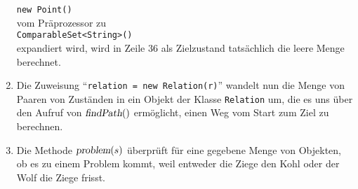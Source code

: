\begin{enumerate}
      \hspace*{1.3cm}
      \texttt{new Point()}
      \\[0.2cm]
      vom Pr\"aprozessor zu
      \\[0.2cm]
      \hspace*{1.3cm}
      \texttt{ComparableSet<String>()}
      \\[0.2cm]
      expandiert wird, wird in Zeile 36 als Zielzustand tats\"achlich die leere Menge
      berechnet.
\item Die Zuweisung ``\texttt{relation = new Relation(r)}'' wandelt nun die Menge von
      Paaren von Zust\"anden in ein Objekt der Klasse \texttt{Relation} um, die es uns
      \"uber den Aufruf von $\textsl{findPath}()$ erm\"oglicht, einen Weg vom Start
      zum Ziel zu berechnen.  
\item Die Methode $\textsl{problem}(s)$ \"uberpr\"uft f\"ur eine gegebene Menge von Objekten,
      ob es zu einem Problem kommt, weil entweder die Ziege den Kohl oder der Wolf die
      Ziege frisst.
\end{enumerate}

